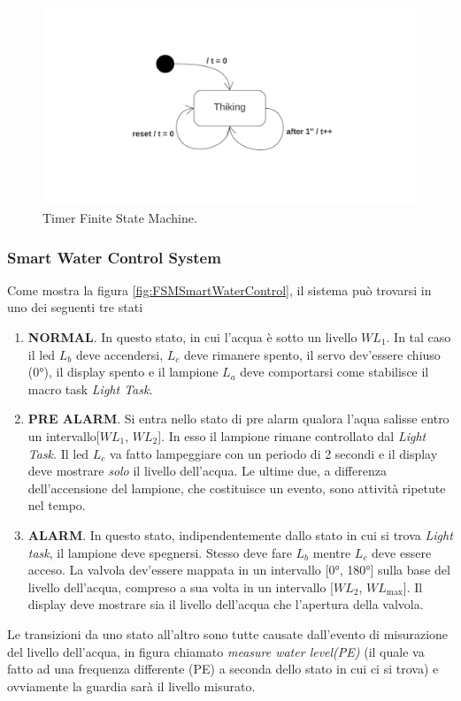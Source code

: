 \documentclass[a4paper,12pt]{report}
\begin{document}
\begin{figure}[H]
\centering
\includegraphics[width=\textwidth]{img/State - Timer.png}
\caption{Timer Finite State Machine.}
\label{fig:FSMTimer}
\end{figure}



\subsubsection{Smart Water Control System}
Come mostra la figura \ref{fig:FSMSmartWaterControl}, il sistema può trovarsi in uno dei seguenti tre stati
\begin{enumerate}
    \item \textbf{NORMAL}. In questo stato, in cui l'acqua è sotto un livello $WL_1$. In tal caso il led $L_b$ deve accendersi, $L_c$ deve rimanere spento, il servo dev'essere chiuso (0°), il display spento e il lampione $L_a$ deve comportarsi come stabilisce il macro task \emph{Light Task}.
    \item \textbf{PRE ALARM}. Si entra nello stato di pre alarm qualora l'aqua salisse entro un intervallo[$WL_1$, $WL_2$]. In esso il lampione rimane controllato dal \emph{Light Task}. Il led $L_c$ va fatto lampeggiare con un periodo di 2 secondi e il display deve mostrare \emph{solo} il livello dell'acqua. Le ultime due, a differenza dell'accensione del lampione, che costituisce un evento, sono attività ripetute nel tempo.
    \item \textbf{ALARM}. In questo stato, indipendentemente dallo stato in cui si trova \emph{Light task}, il lampione deve spegnersi. Stesso deve fare $L_b$ mentre $L_c$ deve essere acceso. La valvola dev'essere mappata in un intervallo [0°, 180°] sulla base del livello dell'acqua, compreso a sua volta in un intervallo [$WL_2$, $WL_\textrm{max}$]. Il display deve mostrare sia il livello dell'acqua che l'apertura della valvola.
\end{enumerate}
Le transizioni da uno stato all'altro sono tutte causate dall'evento di misurazione del livello dell'acqua, in figura chiamato \emph{measure water level(PE)} (il quale va fatto ad una frequenza differente (PE) a seconda dello stato in cui ci si trova) e ovviamente la guardia sarà il livello misurato.
\end{document}
